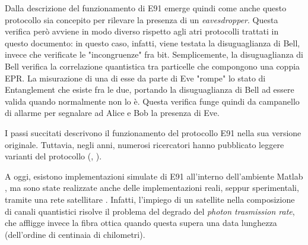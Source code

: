 Dalla descrizione del funzionamento di E91 emerge quindi come anche questo protocollo sia concepito per rilevare la presenza di un \textit{eavesdropper}. Questa verifica però avviene in modo diverso rispetto agli atri protocolli trattati in questo documento: in questo caso, infatti, viene testata la disuguaglianza di Bell, invece che verificate le "incongruenze" fra bit. Semplicemente, la disuguaglianza di Bell verifica la correlazione quantistica tra particelle che compongono una coppia EPR. La misurazione di una di esse da parte di Eve "rompe" lo stato di Entanglement che esiste fra le due, portando la disuguaglianza di Bell ad essere valida quando normalmente non lo è. Questa verifica funge quindi da campanello di allarme per segnalare ad Alice e Bob la presenza di Eve.

I passi succitati descrivono il funzionamento del protocollo E91 nella sua versione originale. Tuttavia, negli anni, numerosi ricercatori hanno pubblicato leggere varianti del protocollo (\cite{hwang}, \cite{lomonaco}).

A oggi, esistono implementazioni simulate di E91 all'interno dell'ambiente Matlab \cite{matlab_impl}, ma sono state realizzate anche delle implementazioni reali, seppur sperimentali, tramite una rete satellitare \cite{ent_impl}. Infatti, l'impiego di un satellite nella composizione di canali quantistici risolve il problema del degrado del \textit{photon trasmission rate}, che affligge invece la fibra ottica quando questa supera una data lunghezza (dell'ordine di centinaia di chilometri).

